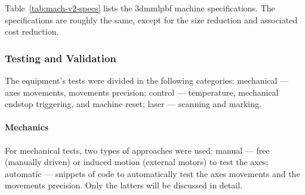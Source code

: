 Table~\ref{tab:mach-v2-specs} lists the \gls{3dmmlpbf} machine
specifications. The specifications are roughly the same, except for the size
reduction and associated cost reduction.
\begin{table}[!hbt]
\centering
\caption{\gls{3dmmlpbf} machine \texttt{v2.0} specifications}
\label{tab:mach-v2-specs}%
\end{table}

\subsubsection{Testing and Validation}%
\label{sec:testing-validation-equip}
The equipment's tests were divided in the following categories: mechanical
--- axes movements, movements precision; control --- temperature, mechanical
endstop triggering, and machine reset; laser --- scanning and marking.

\paragraph{Mechanics}
For mechanical tests, two types of approaches were used: manual --- free
(manually driven) or induced motion (external motors) to test the axes;
automatic --- snippets of code to automatically test the axes movements and the
movements precision. Only the latters will be discussed in detail.

